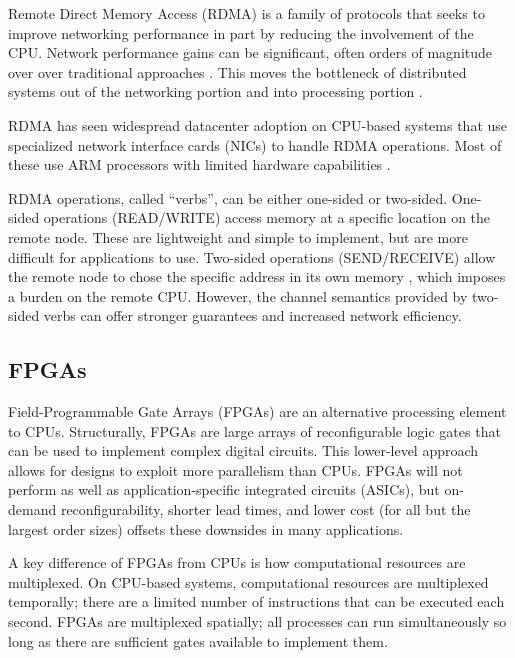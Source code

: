 Remote Direct Memory Access (RDMA) is a family of protocols that seeks to improve networking performance in part by reducing the involvement of the CPU. Network performance gains can be significant, often orders of magnitude over over traditional approaches \autocite{ma-tpds-2022,rdma-reads}. This moves the bottleneck of distributed systems out of the networking portion and into processing portion \autocite{binnig-vldb-2016}.

RDMA has seen widespread datacenter adoption \autocite{strom,mencer-queue-2020} on CPU-based systems that use specialized network interface cards (NICs) to handle RDMA operations. Most of these use ARM processors with limited hardware capabilities \autocite{strom,honeycomb,rdma-reads}.


RDMA operations, called ``verbs'', can be either one-sided or two-sided. One-sided operations (READ/WRITE) access memory at a specific location on the remote node. These are lightweight and simple to implement, but are more difficult for applications to use. Two-sided operations (SEND/RECEIVE) allow the remote node to chose the specific address in its own memory \autocite{base}, which imposes a burden on the remote CPU. However, the channel semantics provided by two-sided verbs can offer stronger guarantees and increased network efficiency.


\subsection{FPGAs}
\label{sec:fpga}

Field-Programmable Gate Arrays (FPGAs) are an alternative processing element to CPUs. Structurally, FPGAs are large arrays of reconfigurable logic gates that can be used to implement complex digital circuits. This lower-level approach allows for designs to exploit more parallelism than CPUs. FPGAs will not perform as well as application-specific integrated circuits (ASICs), but on-demand reconfigurability, shorter lead times, and lower cost (for all but the largest order sizes) offsets these downsides in many applications.

A key difference of FPGAs from CPUs is how computational resources are multiplexed. On CPU-based systems, computational resources are multiplexed temporally; there are a limited number of instructions that can be executed each second. FPGAs are multiplexed spatially; all processes can run simultaneously so long as there are sufficient gates available to implement them.

